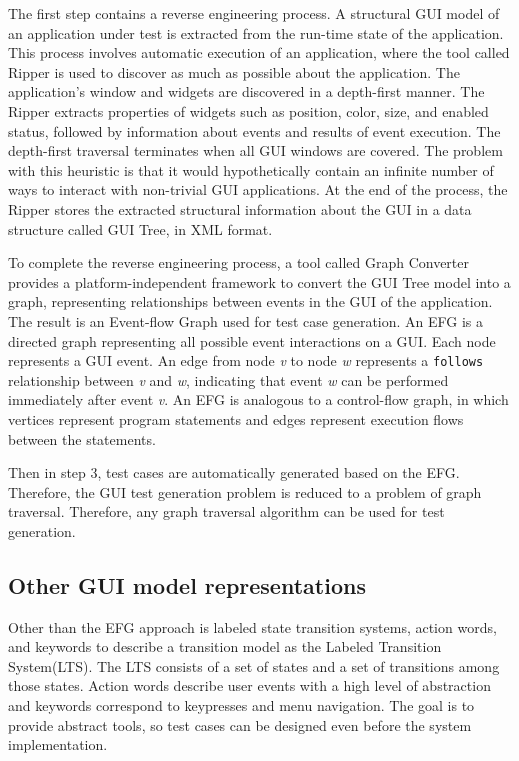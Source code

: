 The first step contains a reverse engineering process. A structural GUI model of an application under test is extracted from the run-time state of the application. This process involves automatic execution of an application, where the tool called Ripper is used to discover as much as possible about the application. The application's window and widgets are discovered in a depth-first manner. The Ripper extracts properties of widgets such as position, color, size, and enabled status, followed by information about events and results of event execution. The depth-first traversal terminates when all GUI windows are covered. The problem with this heuristic is that it would hypothetically contain an infinite number of ways to interact with non-trivial GUI applications. At the end of the process, the Ripper stores the extracted structural information about the GUI in a data structure called GUI Tree, in XML format.

To complete the reverse engineering process, a tool called Graph Converter provides a platform-independent framework to convert the GUI Tree model into a graph, representing relationships between events in the GUI of the application. The result is an Event-flow Graph used for test case generation.
An EFG is a directed graph representing all possible event interactions on a GUI. Each node represents a GUI event. An edge from node \textit{v} to node \textit{w} represents a \verb|follows| relationship between \textit{v} and \textit{w}, indicating that event \textit{w} can be performed immediately after event \textit{v}. An EFG is analogous to a control-flow graph, in which vertices represent program statements and edges represent execution flows between the statements.

Then in step 3, test cases are automatically generated based on the EFG. Therefore, the GUI test generation problem is reduced to a problem of graph traversal. Therefore, any graph traversal algorithm can be used for test generation. 

\subsection{Other GUI model representations}

Other than the EFG approach is labeled state transition systems, action words, and keywords to describe a transition model as the Labeled Transition System(LTS). The LTS consists of a set of states and a set of transitions among those states. Action words describe user events with a high level of abstraction and keywords correspond to keypresses and menu navigation. The goal is to provide abstract tools, so test cases can be designed even before the system implementation. 

